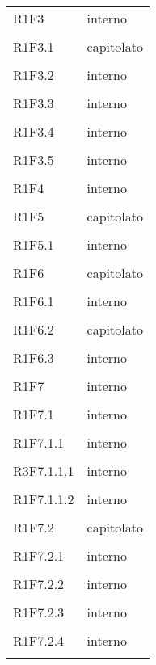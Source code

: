 \documentclass[a4paper]{article}
\begin{document}
\begin{longtable}{ >{\centering}p{}
		>{\centering}p{}}
	R1F3 & interno\\\tabularnewline
	
	R1F3.1 & capitolato\\\tabularnewline
	
	R1F3.2 & interno\\\tabularnewline
	
	R1F3.3 & interno\\\tabularnewline
	
	R1F3.4 & interno\\\tabularnewline
	
	R1F3.5 & interno\\\tabularnewline
	
	R1F4 & interno\\\tabularnewline
	
	R1F5 & capitolato\\\tabularnewline
	
	R1F5.1 & interno\\\tabularnewline
	
	R1F6 & capitolato\\\tabularnewline
	
	R1F6.1 & interno\\\tabularnewline
	
	R1F6.2 & capitolato\\\tabularnewline
	
	R1F6.3 & interno\\\tabularnewline
	
	R1F7 & interno\\\tabularnewline
	
	R1F7.1 & interno\\\tabularnewline
	
	R1F7.1.1 & interno\\\tabularnewline
	
	R3F7.1.1.1 & interno\\\tabularnewline
	
	R1F7.1.1.2 & interno\\\tabularnewline
	
	R1F7.2 & capitolato\\\tabularnewline
	
	R1F7.2.1 & interno\\\tabularnewline
	
	R1F7.2.2 & interno\\\tabularnewline
	
	R1F7.2.3 & interno\\\tabularnewline
	
	R1F7.2.4 & interno\\\tabularnewline
	

\end{longtable}
\end{document}
